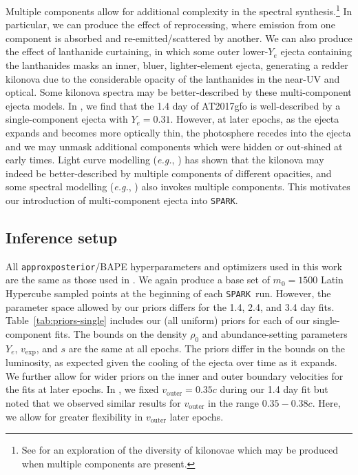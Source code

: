 \documentclass[twocolumn,twocolappendix]{aastex63}
\def\SPARK{\texttt{SPARK}}
\def\V23{\citetalias{vieira23}}
\def\eg{{\it e.g.}}
\begin{document}
Multiple components allow for additional complexity in the spectral synthesis.\footnote{See \cite{kawaguchi20} for an exploration of the diversity of kilonovae which may be produced when multiple components are present.} In particular, we can produce the effect of reprocessing, where emission from one component is absorbed and re-emitted/scattered by another. We can also produce the effect of lanthanide curtaining, in which some outer lower-$Y_e$ ejecta containing the lanthanides masks an inner, bluer, lighter-element ejecta, generating a redder kilonova due to the considerable opacity of the lanthanides in the near-UV and optical. Some kilonova spectra may be better-described by these multi-component ejecta models. In \V23, we find that the 1.4 day of AT2017gfo is well-described by a single-component ejecta with $Y_e = 0.31$. However, at later epochs, as the ejecta expands and becomes more optically thin, the photosphere recedes into the ejecta and we may unmask additional components which were hidden or out-shined at early times. Light curve modelling (\eg, \citealt{villar17}) has shown that the kilonova may indeed be better-described by multiple components of different opacities, and some spectral modelling (\eg, \citealt{kasen17}) also invokes multiple components. This motivates our introduction of multi-component ejecta into \SPARK.




\subsection{Inference setup}\label{ssc:inference-setup}

All \texttt{approxposterior}/BAPE hyperparameters and optimizers used in this work are the same as those used in \V23. We again produce a base set of $m_{0} = 1500$ Latin Hypercube sampled points at the beginning of each \SPARK~run. However, the parameter space allowed by our priors differs for the 1.4, 2.4, and 3.4 day fits. Table~\ref{tab:priors-single} includes our (all uniform) priors for each of our single-component fits. The bounds on the density $\rho_0$ and abundance-setting parameters $Y_e$, $v_{\mathrm{exp}}$, and $s$ are the same at all epochs. The priors differ in the bounds on the luminosity, as expected given the cooling of the ejecta over time as it expands. We further allow for wider priors on the inner and outer boundary velocities for the fits at later epochs. In \V23, we fixed $v_{\mathrm{outer}} = 0.35c$ during our 1.4 day fit but noted that we observed similar results for $v_{\mathrm{outer}}$ in the range $0.35 - 0.38c$. Here, we allow for greater flexibility in $v_{\mathrm{outer}}$ later epochs.
    
\end{document}
